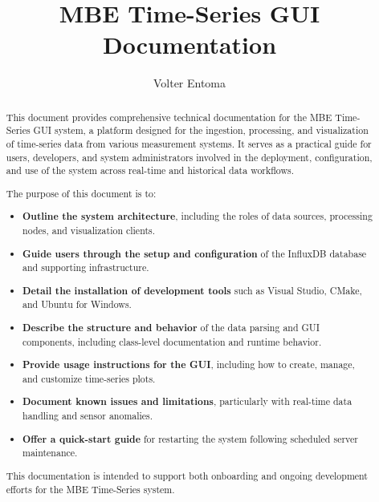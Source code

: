 \documentclass{article}
\title{MBE Time-Series GUI Documentation}
\author{Volter Entoma}
\begin{document}
\maketitle

\begin{abstract}
\noindent
This document provides comprehensive technical documentation for the MBE Time-Series GUI system, a platform designed for the ingestion, processing, and visualization of time-series data from various measurement systems. It serves as a practical guide for users, developers, and system administrators involved in the deployment, configuration, and use of the system across real-time and historical data workflows.

\vspace{10pt}
\noindent
The purpose of this document is to:
\begin{itemize}
    \item \textbf{Outline the system architecture}, including the roles of data sources, processing nodes, and visualization clients.
    \item \textbf{Guide users through the setup and configuration} of the InfluxDB database and supporting infrastructure.
    \item \textbf{Detail the installation of development tools} such as Visual Studio, CMake, and Ubuntu for Windows.
    \item \textbf{Describe the structure and behavior} of the data parsing and GUI components, including class-level documentation and runtime behavior.
    \item \textbf{Provide usage instructions for the GUI}, including how to create, manage, and customize time-series plots.
    \item \textbf{Document known issues and limitations}, particularly with real-time data handling and sensor anomalies.
    \item \textbf{Offer a quick-start guide} for restarting the system following scheduled server maintenance.
\end{itemize}


\vspace{10pt}
\noindent
This documentation is intended to support both onboarding and ongoing development efforts for the MBE Time-Series system.
\end{abstract}


\tableofcontents


\end{document}
